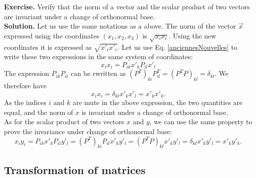 \documentclass[DIV=12]{article}
\begin{document}
{\bf{Exercise.}} Verify that the norm of a vector and the scalar product of two vectors are invariant under a change of orthonormal base.\\

{\bf{Solution.}} Let us use the same notations as a above. The norm of the vector $\vec{x}$ expressed using the coordinates
  $(x_1,x_2,x_3)$ is $\sqrt{x_i x_i}$. Using the new coordinates it is expressed as $\sqrt{x'_i x'_i}$. Let us use
 Eq. \ref{anciennesNouvelles} to write these two expressions in the same system of coordinates:
\begin{equation}
x_i x_i =  P_{ik}x'_k P_{il}x'_l 
 \label{normComp}
 \end{equation}
The expression $P_{ik}P_{il}$ can be rwritten as  $(P^T)_{ki}P^T_{il} = (P^TP)_{kl} = \delta_{kl}$.
We therefore have
\begin{equation}
x_i x_i =  \delta_{kl}x'_k x'_l = x'_k x'_k.
 \label{normComp}
\end{equation}
As the indices $i$ and $k$ are mute in the above expression, the two quantities 
 are equal, and the norm of $x$ is invariant under a change of orthonormal base.\\
As for the scalar product of two vectors $x$ and $y$, we can use the same property to prove the invariance under
change of orthonormal base:\\
\begin{equation}
x_i y_i = P_{ik}x'_k P_{il}y'_l = (P^T)_{ki}P_{il} x'_k y'_l =  (P^TP)_{kl}  x'_k y'_l= \delta_{kl} x'_k y'_l = x'_k y'_k.
\label{normExp}
\end{equation}


\subsection{Transformation of matrices}
\end{document}
